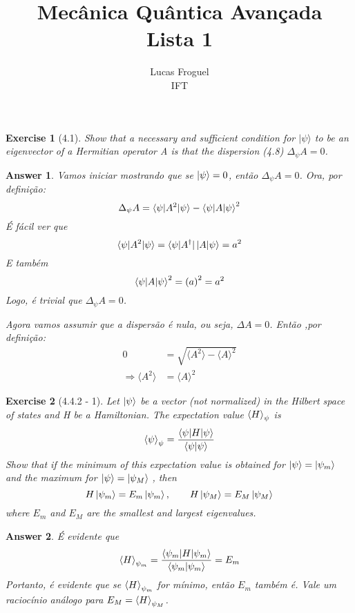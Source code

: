 \documentclass[12pt]{article}
\title{Mecânica Quântica Avançada \\ Lista 1}
\author{Lucas Froguel \\ IFT}
\date{}
\def\be{\begin{equation}}
\def\ee{\end{equation}}
\def\f{\frac}
\def\l{\left}
\def\r{\right}
\newtheorem{exercise}{Exercise}
\newtheorem{answer}{Answer}
\begin{document}
	\maketitle
	
	
	\begin{exercise}[4.1]
		Show that a necessary and sufficient condition for $|\psi\rangle$ to be an eigenvector of a Hermitian
		operator A is that the dispersion (4.8) $\Delta_\psi A = 0$.
	\end{exercise}
	\begin{answer}
		Vamos iniciar mostrando que se $\ket{\psi}=0$, então $\Delta_\psi A = 0$. Ora, por definição:
		\be
			\Delta_\psi A = \braket{\psi|A^2|\psi} - \braket{\psi|A|\psi}^2
		\ee
		É fácil ver que
		\be
			\braket{\psi|A^2|\psi} = \bra{\psi|A^\dagger}\ket{A|\psi} = a^2
		\ee
		E também
		\be
			\braket{\psi|A|\psi}^2 = \l(a\r)^2 = a^2
		\ee
		Logo, é trivial que $\Delta_\psi A = 0$. 
		
		Agora vamos assumir que a dispersão é nula, ou seja, $\Delta A = 0$. Então ,por definição:		
		\begin{align}
			0 &= \sqrt{\langle A^2 \rangle - \langle A \rangle^2} \\
			\Rightarrow \langle A^2 \rangle &= \langle A \rangle^2
		\end{align}		
				
	\end{answer}

	\begin{exercise}[4.4.2 - 1]
		 Let $\ket{\psi}$ be a vector (not normalized) in the Hilbert space of states and H be a Hamiltonian. The
		expectation value $\braket{H}_\psi$ is
		\be
			\braket{\psi}_\psi = \f{\braket{\psi|H|\psi}}{\braket{\psi|\psi}}
		\ee
		Show that if the minimum of this expectation value is obtained for $\ket{\psi}=\ket{\psi_m}$ and the maximum for $\ket{\psi}=\ket{\psi_M}$ , then
		\be
			H\ket{\psi_m} = E_m\ket{\psi_m}, \quad\quad H\ket{\psi_M} = E_M\ket{\psi_M}
		\ee 	
		where $E_m$ and $E_M$ are the smallest and largest eigenvalues.
	\end{exercise}
	\begin{answer}
		É evidente que
		\be
			\braket{H}_{\psi_m} = \f{\braket{\psi_m|H|\psi_m}}{\braket{\psi_m|\psi_m}} = E_m
		\ee
		Portanto, é evidente que se $\braket{H}_{\psi_m}$ for mínimo, então $E_m$ também é. Vale um raciocínio análogo para $E_M=\braket{H}_{\psi_M}$. 		
	\end{answer}
	
\end{document}

